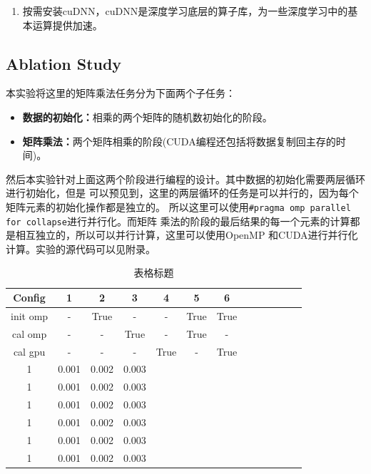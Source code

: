 \documentclass{article}
\begin{document}
\begin{enumerate}
    输入下面的指令和看到下面输出的结果之后，说明CUDA已经安装成功。
    \begin{lstlisting}[style=bashstyle]
(base) PS C:\Users\24692> nvcc -V
nvcc: NVIDIA (R) Cuda compiler driver
Copyright (c) 2005-2021 NVIDIA Corporation
Built on Fri_Dec_17_18:28:54_Pacific_Standard_Time_2021
Cuda compilation tools, release 11.6, V11.6.55
Build cuda_11.6.r11.6/compiler.30794723_0
(base) PS C:\Users\24692> nvidia-smi
Mon Apr  8 09:38:47 2024
NVIDIA-SMI 551.86   Driver Version: 551.86    CUDA Version: 12.4   
    \end{lstlisting}
    这里的CUDA Version和CUDA Toolkit的版本不一样是因为这里的CUDA Version是显卡支持的
    最高CUDA版本，而CUDA Toolkit是你安装的CUDA版本。
    \item 按需安装cuDNN，cuDNN是深度学习底层的算子库，为一些深度学习中的基本运算提供加速。
\end{enumerate}
\subsection{Ablation Study}
本实验将这里的矩阵乘法任务分为下面两个子任务：
\begin{itemize}
    \item \textbf{数据的初始化：}相乘的两个矩阵的随机数初始化的阶段。
    \item \textbf{矩阵乘法：}两个矩阵相乘的阶段(CUDA编程还包括将数据复制回主存的时间)。
\end{itemize}
然后本实验针对上面这两个阶段进行编程的设计。其中数据的初始化需要两层循环进行初始化，但是
可以预见到，这里的两层循环的任务是可以并行的，因为每个矩阵元素的初始化操作都是独立的。
所以这里可以使用\texttt{\#pragma omp parallel for collapse}进行并行化。而矩阵
乘法的阶段的最后结果的每一个元素的计算都是相互独立的，所以可以并行计算，这里可以使用OpenMP
和CUDA进行并行化计算。实验的源代码可以见附录。

\begin{table}[ht]
    \centering
    \begin{tabular}{|c|c|c|c|c|c|c|c|c|c|c|c|c|}
        \hline
        Config & 1 & 2 & 3 & 4 & 5 & 6 \\
        \hline
        init omp & - & True & - & - & True & True\\
        \hline
        cal omp & - & - & True & - & True & - \\
        \hline
        cal gpu & - & - & - & True & - & True \\
        \hline
        1 & 0.001 & 0.002 & 0.003 &  &  & \\
        1 & 0.001 & 0.002 & 0.003 &  &  & \\
        1 & 0.001 & 0.002 & 0.003 &  &  & \\
        1 & 0.001 & 0.002 & 0.003 &  &  & \\
        1 & 0.001 & 0.002 & 0.003 &  &  & \\
        1 & 0.001 & 0.002 & 0.003 &  &  & \\
        \hline
    
    \end{tabular}
    \caption{表格标题}
\end{table}
\end{document}
